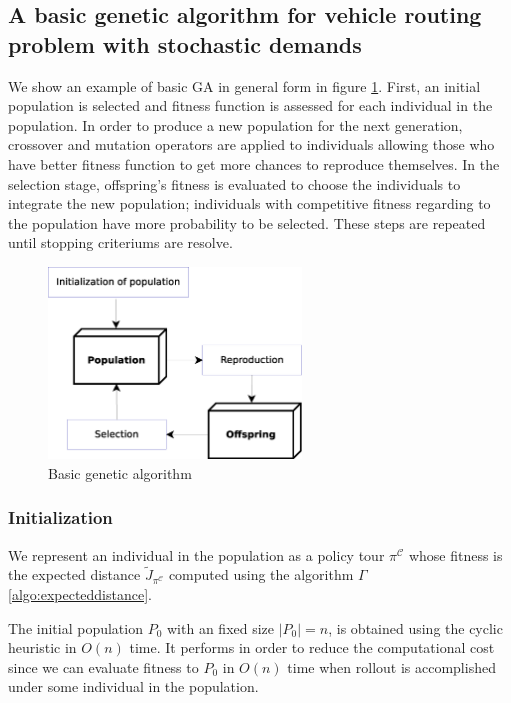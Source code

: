 \subsection{A basic genetic algorithm for vehicle routing problem with stochastic demands}

We show an example of basic GA in general form in figure \ref{fig:ga_basic}. First, an initial population is selected and fitness function is assessed for each individual in the population. In order to produce a new population for the next generation, crossover and mutation operators are applied to individuals allowing those who have better fitness function to get more chances to reproduce themselves. In the selection stage, offspring's fitness is evaluated to choose the individuals to integrate the new population; individuals with competitive fitness regarding to the population have more probability to be selected. These steps are repeated until stopping criteriums are resolve.

\begin{figure}[!htbp]
  \begin{center}
   \includegraphics[width=0.6\textwidth]{Images/Chapter3/ga_basic.eps}
  \end{center}
    \caption{Basic genetic algorithm}\label{fig:ga_basic}
\end{figure}

\subsubsection*{Initialization}

We represent an individual in the population as a policy tour $\pi^\mathcal{C}$ whose fitness is the expected distance $\tilde{J}_{\pi^\mathcal{C}}$ computed using the algorithm $\Gamma$ \ref{algo:expecteddistance}.

The initial population $P_0$ with an fixed size $|P_0| = n$, is obtained using the cyclic heuristic in $O(n)$ time. It performs in order to reduce the computational cost since we can evaluate fitness to $P_0$ in $O(n)$ time when rollout is accomplished under some individual in the population.



